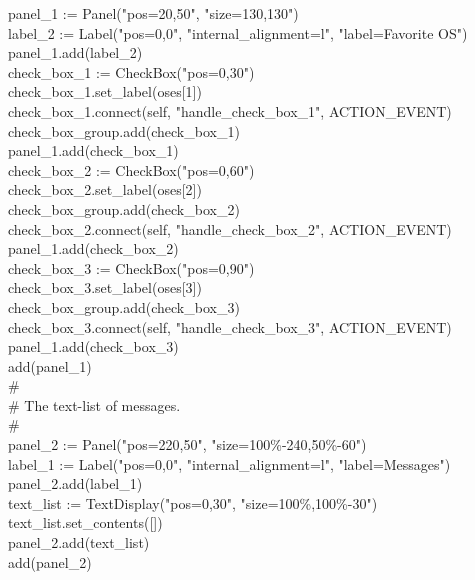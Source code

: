 {\>   \ \ \ panel\_1 := Panel("pos=20,50",
"size=130,130") \\
\>   \ \ \ label\_2 := Label("pos=0,0",
"internal\_alignment=l",
"label=Favorite OS") \\
\>   \ \ \ panel\_1.add(label\_2) \\
\>   \ \ \ check\_box\_1 :=
CheckBox("pos=0,30") \\
\>   \ \ \ check\_box\_1.set\_label(oses[1]) \\
\>   \ \ \ check\_box\_1.connect(self,
"handle\_check\_box\_1", ACTION\_EVENT) \\
\>   \ \ \ check\_box\_group.add(check\_box\_1) \\
\>   \ \ \ panel\_1.add(check\_box\_1) \\
\>   \ \ \ check\_box\_2 :=
CheckBox("pos=0,60") \\
\>   \ \ \ check\_box\_2.set\_label(oses[2]) \\
\>   \ \ \ check\_box\_group.add(check\_box\_2) \\
\>   \ \ \ check\_box\_2.connect(self,
"handle\_check\_box\_2", ACTION\_EVENT) \\
\>   \ \ \ panel\_1.add(check\_box\_2) \\
\>   \ \ \ check\_box\_3 :=
CheckBox("pos=0,90") \\
\>   \ \ \ check\_box\_3.set\_label(oses[3]) \\
\>   \ \ \ check\_box\_group.add(check\_box\_3) \\
\>   \ \ \ check\_box\_3.connect(self,
"handle\_check\_box\_3", ACTION\_EVENT) \\
\>   \ \ \ panel\_1.add(check\_box\_3) \\
\>   \ \ \ add(panel\_1) \\
\>   \ \ \ \# \\
\>   \ \ \ \# The text-list of messages. \\
\>   \ \ \ \# \\
\>   \ \ \ panel\_2 := Panel("pos=220,50",
"size=100\%-240,50\%-60") \\
\>   \ \ \ label\_1 := Label("pos=0,0",
"internal\_alignment=l",
"label=Messages") \\
\>   \ \ \ panel\_2.add(label\_1) \\
\>   \ \ \ text\_list :=
TextDisplay("pos=0,30",
"size=100\%,100\%-30") \\
\>   \ \ \ text\_list.set\_contents([]) \\
\>   \ \ \ panel\_2.add(text\_list) \\
\>   \ \ \ add(panel\_2) \\
}
